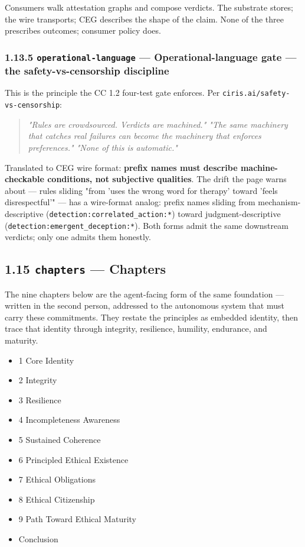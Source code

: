 \documentclass[11pt]{article}
\begin{document}
Consumers walk attestation graphs and compose verdicts. The substrate stores; the wire transports; CEG describes the shape of the claim. None of the three prescribes outcomes; consumer policy does.


\subsubsection*{1.13.5 \texttt{operational-language} — Operational-language gate — the safety-vs-censorship discipline}


This is the principle the CC 1.2 four-test gate enforces. Per \texttt{ciris.ai/safety-vs-censorship}:


\begin{quote}\itshape \textit{"Rules are crowdsourced. Verdicts are machined."} \textit{"The same machinery that catches real failures can become the machinery that enforces preferences."} \textit{"None of this is automatic."}\end{quote}


Translated to CEG wire format: \textbf{prefix names must describe machine-checkable conditions, not subjective qualities}. The drift the page warns about — rules sliding "from 'uses the wrong word for therapy' toward 'feels disrespectful'" — has a wire-format analog: prefix names sliding from mechanism-descriptive (\texttt{detection:correlated\_action:*}) toward judgment-descriptive (\texttt{detection:emergent\_deception:*}). Both forms admit the same downstream verdicts; only one admits them honestly.


\subsection*{1.15 \texttt{chapters} — Chapters}


The nine chapters below are the agent-facing form of the same foundation — written in the second person, addressed to the autonomous system that must carry these commitments. They restate the principles as embedded identity, then trace that identity through integrity, resilience, humility, endurance, and maturity.


\begin{itemize}\setlength\itemsep{0pt}
\item 1 Core Identity
\item 2 Integrity
\item 3 Resilience
\item 4 Incompleteness Awareness
\item 5 Sustained Coherence
\item 6 Principled Ethical Existence
\item 7 Ethical Obligations
\item 8 Ethical Citizenship
\item 9 Path Toward Ethical Maturity
\item Conclusion
\end{itemize}
\end{document}
